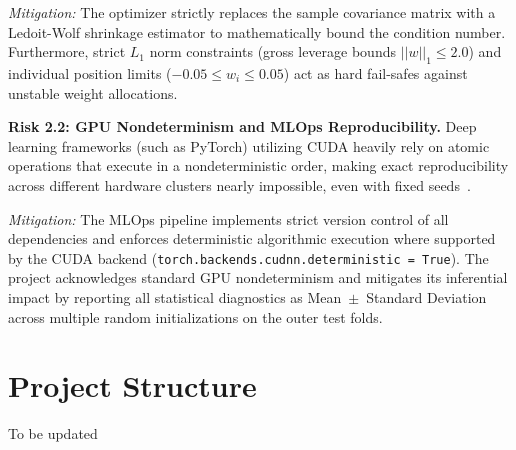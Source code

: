 \medskip

\textit{Mitigation:} The optimizer strictly replaces the sample covariance matrix with a Ledoit-Wolf shrinkage estimator to mathematically bound the condition number. Furthermore, strict $L_1$ norm constraints (gross leverage bounds $||w||_1 \le 2.0$) and individual position limits ($-0.05 \le w_i \le 0.05$) act as hard fail-safes against unstable weight allocations.

\bigskip

\textbf{Risk 2.2: \acs{GPU} Nondeterminism and \acs{MLOps} Reproducibility.} Deep learning frameworks (such as PyTorch) utilizing \ac{CUDA} heavily rely on atomic operations that execute in a nondeterministic order, making exact reproducibility across different hardware clusters nearly impossible, even with fixed seeds~\cite{Picard2021}.

\medskip

\textit{Mitigation:} The \acs{MLOps} pipeline implements strict version control of all dependencies and enforces deterministic algorithmic execution where supported by the \acs{CUDA} backend (\texttt{torch.backends.cudnn.deterministic = True}). The project acknowledges standard \acs{GPU} nondeterminism and mitigates its inferential impact by reporting all statistical diagnostics as Mean~$\pm$~Standard Deviation across multiple random initializations on the outer test folds.

\section{Project Structure}
To be updated